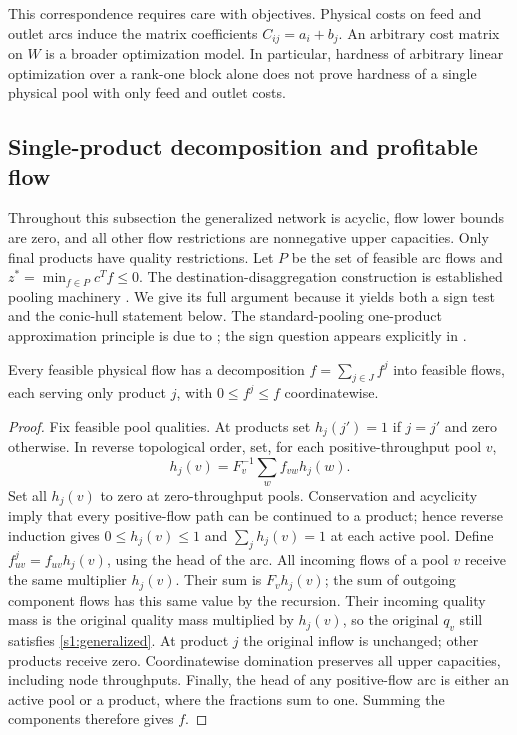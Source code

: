 This correspondence requires care with objectives. Physical costs on
feed and outlet arcs induce the matrix coefficients $C_{ij}=a_i+b_j$.
An arbitrary cost matrix on $W$ is a broader optimization model.
In particular, hardness of arbitrary linear optimization over a
rank-one block alone does not prove hardness of a single physical pool
with only feed and outlet costs.

\subsection{Single-product decomposition and profitable flow}\label{s1:triviality}

Throughout this subsection the generalized network is acyclic, flow
lower bounds are zero, and all other flow restrictions are nonnegative
upper capacities. Only final products have quality restrictions. Let
$P$ be the set of feasible arc flows and $z^*=\min_{f\in P}c^Tf\le0$.
The destination-disaggregation construction is established pooling
machinery \citep{boland2016-new-multi-commodity-flow-formulations}.
We give its full argument because it yields both a sign test and the
conic-hull statement below. The standard-pooling one-product
approximation principle is due to
\citet{dey2015-analysis-of-milp-techniques-for}; the sign question appears
explicitly in \citet[Remark~2.2]{gupte2017-relaxations-and-discretizations-for-the}.

\begin{lemma}\label{s1:destination}
Every feasible physical flow has a decomposition
$f=\sum_{j\in J}f^j$ into feasible flows, each serving only product $j$,
with $0\le f^j\le f$ coordinatewise.
\end{lemma}
\begin{proof}
Fix feasible pool qualities. At products set
$h_j(j')=1$ if $j=j'$ and zero otherwise. In reverse topological order,
set, for each positive-throughput pool $v$,
\[
 h_j(v)=F_v^{-1}\sum_wf_{vw}h_j(w).
\]
Set all $h_j(v)$ to zero at zero-throughput pools. Conservation and
acyclicity imply that every positive-flow path can be continued to a
product; hence reverse induction gives $0\le h_j(v)\le1$ and
$\sum_jh_j(v)=1$ at each active pool. Define
$f^j_{uv}=f_{uv}h_j(v)$, using the head of the arc.
All incoming flows of a pool $v$ receive the same multiplier $h_j(v)$.
Their sum is $F_vh_j(v)$; the sum of outgoing component flows has this
same value by the recursion. Their incoming quality mass is the original
quality mass multiplied by $h_j(v)$, so the original $q_v$ still satisfies
\eqref{s1:generalized}. At product $j$ the original inflow is unchanged;
other products receive zero. Coordinatewise domination preserves all
upper capacities, including node throughputs. Finally, the head of any
positive-flow arc is either an active pool or a product, where the
fractions sum to one. Summing the components therefore gives $f$.
\end{proof}

